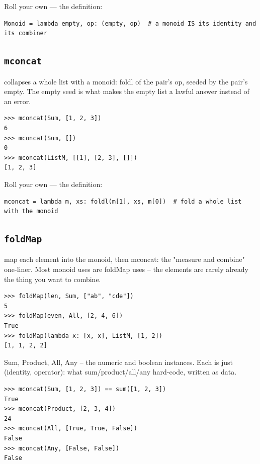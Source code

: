 \documentclass[10pt,letterpaper]{book}
\begin{document}
Roll your own --- the definition:

\begin{lstlisting}[style=ex]
Monoid = lambda empty, op: (empty, op)  # a monoid IS its identity and its combiner
\end{lstlisting}
\subsection{\texttt{mconcat}}\label{def:mconcat}
collapses a whole list with a monoid: foldl of the pair's op, seeded by the pair's empty. The empty seed is what makes the empty list a lawful answer instead of an error.
\begin{lstlisting}[style=ex]
>>> mconcat(Sum, [1, 2, 3])
6
>>> mconcat(Sum, [])
0
>>> mconcat(ListM, [[1], [2, 3], []])
[1, 2, 3]
\end{lstlisting}

Roll your own --- the definition:

\begin{lstlisting}[style=ex]
mconcat = lambda m, xs: foldl(m[1], xs, m[0])  # fold a whole list with the monoid
\end{lstlisting}

\subsection{\texttt{foldMap}}\label{def:foldMap}
map each element into the monoid, then mconcat: the "measure and combine" one-liner. Most monoid uses are foldMap uses -- the elements are rarely already the thing you want to combine.
\begin{lstlisting}[style=ex]
>>> foldMap(len, Sum, ["ab", "cde"])
5
>>> foldMap(even, All, [2, 4, 6])
True
>>> foldMap(lambda x: [x, x], ListM, [1, 2])
[1, 1, 2, 2]
\end{lstlisting}

Sum, Product, All, Any -- the numeric and boolean instances. Each is just (identity, operator): what sum/product/all/any hard-code, written as data.

\begin{lstlisting}[style=ex]
>>> mconcat(Sum, [1, 2, 3]) == sum([1, 2, 3])
True
>>> mconcat(Product, [2, 3, 4])
24
>>> mconcat(All, [True, True, False])
False
>>> mconcat(Any, [False, False])
False
\end{lstlisting}
\end{document}
